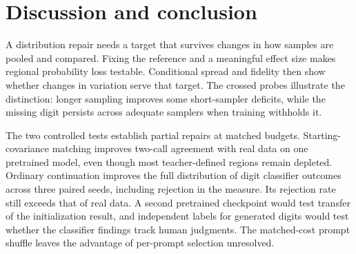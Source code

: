 \section{Discussion and conclusion}
\label{sec:discussion}
A distribution repair needs a target that survives changes in how
samples are pooled and compared. Fixing the reference and a meaningful
effect size makes regional probability loss testable. Conditional spread
and fidelity then show whether changes in variation serve that target.
The crossed probes illustrate the distinction: longer sampling improves
some short-sampler deficits, while the missing digit persists across
adequate samplers when training withholds it.

The two controlled tests establish partial repairs at matched budgets.
Starting-covariance matching improves two-call agreement with real data
on one pretrained model, even though most teacher-defined regions remain
depleted. Ordinary continuation improves the full distribution of digit
classifier outcomes across three paired seeds, including rejection in
the measure. Its rejection rate still exceeds that of real data. A second
pretrained checkpoint would test transfer of the initialization result,
and independent labels for generated digits would test whether the
classifier findings track human judgments. The matched-cost prompt
shuffle leaves the advantage of per-prompt selection unresolved.
